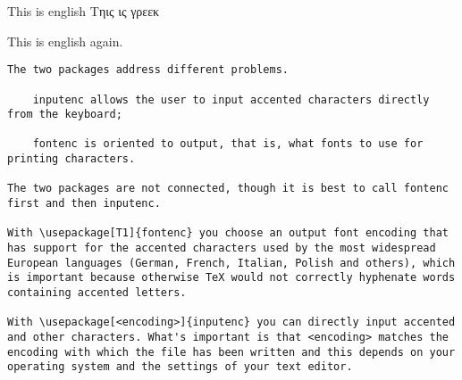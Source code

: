 \documentclass{article}
\renewcommand*{\textgreek}[1]{%
  \foreignlanguage{greek}{#1}%
}
\begin{document}
This is english
\textgreek{Τηις ις γρεεκ}
This is english again.



\begin{verbatim}
The two packages address different problems.

    inputenc allows the user to input accented characters directly from the keyboard;

    fontenc is oriented to output, that is, what fonts to use for printing characters.

The two packages are not connected, though it is best to call fontenc first and then inputenc.

With \usepackage[T1]{fontenc} you choose an output font encoding that has support for the accented characters used by the most widespread European languages (German, French, Italian, Polish and others), which is important because otherwise TeX would not correctly hyphenate words containing accented letters.

With \usepackage[<encoding>]{inputenc} you can directly input accented and other characters. What's important is that <encoding> matches the encoding with which the file has been written and this depends on your operating system and the settings of your text editor.


\end{verbatim}
\end{document}
